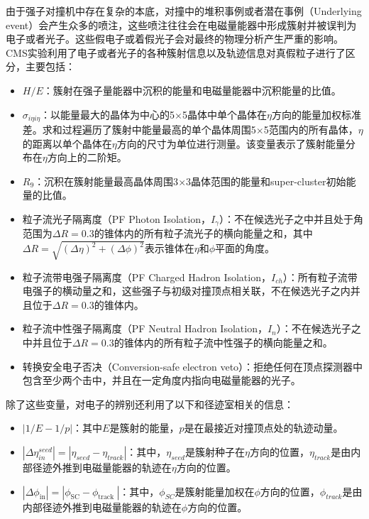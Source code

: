 由于强子对撞机中存在复杂的本底，对撞中的堆积事例或者潜在事例（Underlying event）会产生众多的喷注，这些喷注往往会在电磁量能器中形成簇射并被误判为电子或者光子。这些假电子或着假光子会对最终的物理分析产生严重的影响。CMS实验利用了电子或者光子的各种簇射信息以及轨迹信息对真假粒子进行了区分，主要包括：
\begin{itemize}
    \item $H/E$：簇射在强子量能器中沉积的能量和电磁量能器中沉积能量的比值。
    \item $\sigma_{i\eta i\eta}$：以能量最大的晶体为中心的5$\times$5晶体中单个晶体在$\eta$方向的能量加权标准差。求和过程遍历了簇射中能量最高的单个晶体周围5$\times$5范围内的所有晶体，$\eta$的距离以单个晶体在$\eta$方向的尺寸为单位进行测量。该变量表示了簇射能量分布在$\eta$方向上的二阶矩。
    \item $R_{9}$：沉积在簇射能量最高晶体周围3$\times$3晶体范围的能量和super-cluster初始能量的比值。
    \item 粒子流光子隔离度（PF Photon Isolation，$I_{\gamma}$）：不在候选光子之中并且处于角范围为$\Delta R=0.3$的锥体内的所有粒子流光子的横向能量之和，其中$\Delta R = \sqrt{(\Delta\eta)^2+(\Delta\phi)^2}$表示锥体在$\eta$和$\phi$平面的角度。
    \item 粒子流带电强子隔离度（PF Charged Hadron Isolation，$I_{ch}$）：所有粒子流带电强子的横动量之和，这些强子与初级对撞顶点相关联，不在候选光子之内并且位于$\Delta R=0.3$的锥体内。
    \item 粒子流中性强子隔离度（PF Neutral Hadron Isolation，$I_{n}$）：不在候选光子之中并且位于$\Delta R=0.3$的锥体内的所有粒子流中性强子的横向能量之和。
    \item 转换安全电子否决（Conversion-safe
    electron veto）：拒绝任何在顶点探测器中包含至少两个击中，并且在一定角度内指向电磁量能器的光子。
\end{itemize}
除了这些变量，对电子的辨别还利用了以下和径迹室相关的信息：
\begin{itemize}
    \item $|1 / E-1 / p|$：其中$E$是簇射的能量，$p$是在最接近对撞顶点处的轨迹动量。
    \item $|\Delta\eta_{in}^{seed}| = |\eta_{seed}-\eta_{track}|$：其中，$\eta_{seed}$是簇射种子在$\eta$方向的位置，$\eta_{track}$是由内部径迹外推到电磁量能器的轨迹在$\eta$方向的位置。
    \item $\left|\Delta \phi_{\mathrm{in}}\right|=\left|\phi_{\mathrm{SC}}-\phi_{\text {track }}\right|$：其中，$\phi_{SC}$是簇射能量加权在$\phi$方向的位置，$\phi_{track}$是由内部径迹外推到电磁量能器的轨迹在$\phi$方向的位置。
\end{itemize}

